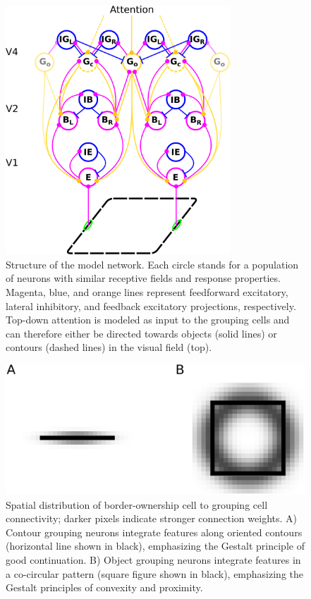 \begin{figure}[t!]
\centering
\includegraphics[width=0.75\textwidth]{Contour/figs/Fig1.eps}
\makeatletter
\let\@currsize\normalsize
\caption[Structure of the grouping model network]{Structure of the model network. Each circle stands for a population of neurons with similar receptive fields and response properties. Magenta, blue, and orange lines represent feedforward excitatory, lateral inhibitory, and feedback excitatory projections, respectively. Top-down attention is modeled as input to the grouping cells and can therefore either be directed towards objects (solid lines) or contours (dashed lines) in the visual field (top).}
\label{Fig:anatomy}
\end{figure}

\begin{figure}[t]
\centering
\includegraphics[width=\textwidth]{Contour/figs/Fig2.eps}
\makeatletter
\let\@currsize\normalsize
\caption[Contour and object grouping cell receptive fields]{Spatial distribution of border-ownership cell to grouping cell connectivity; darker pixels indicate stronger connection weights. A) Contour grouping neurons integrate features along oriented contours (horizontal line shown in black), emphasizing the Gestalt principle of good continuation. B) Object grouping neurons integrate features in a co-circular pattern (square figure shown in black), emphasizing the Gestalt principles of convexity and proximity.} 
\label{Fig:BG_projections}
\end{figure}

